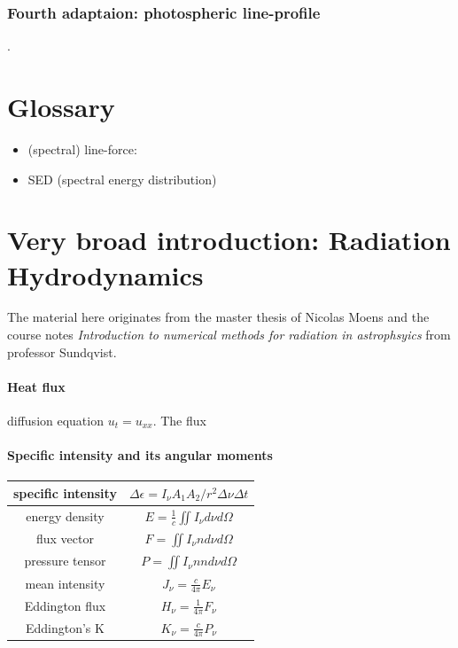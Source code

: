 \documentclass[10pt,a4paper]{article}
\begin{document}
\subsubsection{Fourth adaptaion: photospheric line-profile }
.

\newpage
\section{Glossary}
\begin{itemize}
\item (spectral) line-force: 

\item SED (spectral energy distribution)

\end{itemize}


\newpage
\section{Very broad introduction: Radiation Hydrodynamics}
The material here originates from the master thesis of Nicolas Moens and the course notes \textit{Introduction to numerical methods for radiation in astrophsyics} from professor Sundqvist. 

\paragraph{Heat flux}
diffusion equation $u_t = u_{xx}$. The flux  

\paragraph{Specific intensity and its angular moments}

\begin{center}
\centering
{\tabulinesep=1.5mm
\begin{tabu}{|c|c|}
\hline 
specific intensity & $\Delta \epsilon = \boxed{I_{\nu}} A_1 A_2/r^2 \Delta \nu \Delta t$ \\ \hline
energy density & $E = \frac{1}{c} \iint I_{\nu} d\nu d\Omega$ \\ \hline
flux vector & $F = \iint I_{\nu}n d\nu d\Omega$ \\ \hline
pressure tensor & $P = \iint I_{\nu} nn d\nu d\Omega$ \\ \hline
mean intensity & $J_{\nu} = \frac{c}{4 \pi} E_{\nu}$ \\ \hline
Eddington flux & $H_{\nu} = \frac{1}{4 \pi} F_{\nu}$ \\ \hline
Eddington's K & $K_{\nu} = \frac{c}{4 \pi}P_{\nu}$ \\ \hline
\end{tabu}}
\end{center}
\end{document}
